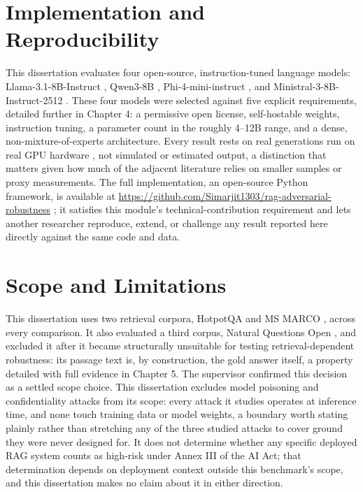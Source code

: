 \section{Implementation and Reproducibility}

This dissertation evaluates four open-source, instruction-tuned language
models: Llama-3.1-8B-Instruct \cite{grattafiori2024llama3}, Qwen3-8B
\cite{yang2025qwen3}, Phi-4-mini-instruct \cite{abouelenin2025phi4mini},
and Ministral-3-8B-Instruct-2512 \cite{mistralai2025ministral3}. These
four models were selected against five explicit requirements, detailed
further in Chapter 4: a permissive open license, self-hostable weights,
instruction tuning, a parameter count in the roughly 4--12B range, and a
dense, non-mixture-of-experts architecture. Every result rests on real
generations run on real GPU hardware \cite{runpod2024platform}, not
simulated or estimated output, a distinction that matters given how much
of the adjacent literature relies on smaller samples or proxy
measurements. The full implementation, an open-source Python framework,
is available at
\url{https://github.com/Simarjit1303/rag-adversarial-robustness}
\cite{singh2026ragrepo}; it satisfies this module's technical-contribution
requirement and lets another researcher reproduce, extend, or challenge
any result reported here directly against the same code and data.

\section{Scope and Limitations}

This dissertation uses two retrieval corpora, HotpotQA
\cite{yang2018hotpotqa} and MS MARCO \cite{nguyen2016msmarco}, across
every comparison. It also evaluated a third corpus, Natural Questions
Open \cite{kwiatkowski2019natural}, and excluded it after it became
structurally unsuitable for testing retrieval-dependent robustness: its
passage text is, by construction, the gold answer itself, a property
detailed with full evidence in Chapter 5. The supervisor confirmed this
decision as a settled scope choice. This dissertation excludes model
poisoning and confidentiality attacks from its scope: every attack it
studies operates at inference time, and none touch training data or
model weights, a boundary worth stating plainly rather than stretching
any of the three studied attacks to cover ground they were never
designed for. It does not determine whether any specific deployed RAG
system counts as high-risk under Annex III of the AI Act; that
determination depends on deployment context outside this benchmark's
scope, and this dissertation makes no claim about it in either
direction.

